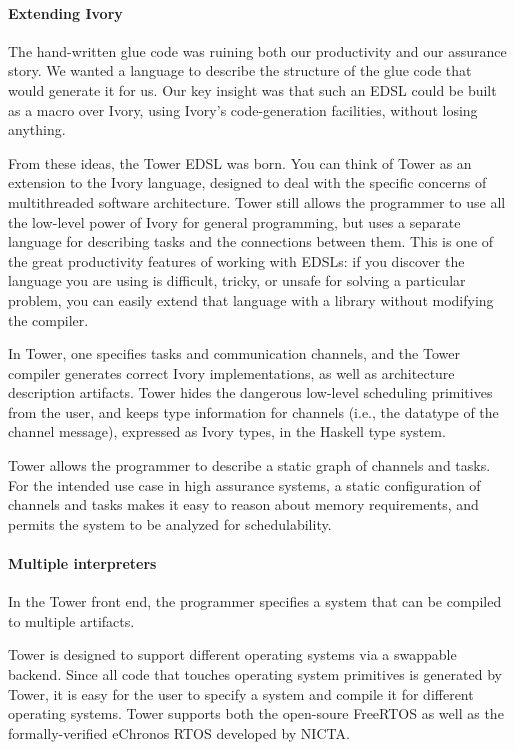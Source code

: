 \paragraph{Extending Ivory}
The hand-written glue code was ruining both our productivity and our assurance
story. We wanted a language to describe the structure of the glue code that
would generate it for us.
Our key insight was that such an EDSL could be built as a macro over Ivory,
using Ivory's code-generation facilities, without losing anything.

From these ideas, the Tower EDSL was born. You can think of Tower as an
extension to the Ivory language, designed to deal with the specific concerns of
multithreaded software architecture. Tower still allows the programmer to use
all the low-level power of Ivory for general programming, but uses a separate
language for describing tasks and the connections between them.  This is one of
the great productivity features of working with EDSLs: if you discover the
language you are using is difficult, tricky, or unsafe for solving a particular
problem, you can easily extend that language with a library without modifying
the compiler.

In Tower, one specifies tasks and communication channels, and the Tower compiler
generates correct
Ivory implementations, as well as architecture description artifacts. Tower
hides the dangerous low-level scheduling primitives from the user, and keeps
type information for channels (i.e., the datatype of the channel message),
expressed as Ivory types, in the Haskell type system.

Tower allows the programmer to describe a static graph of channels and tasks.
For the intended use case in high assurance systems, a static configuration of
channels and tasks makes it easy to reason about memory requirements, and
permits the system to be analyzed for schedulability.

\paragraph{Multiple interpreters}

In the Tower front end, the programmer specifies a system that can be compiled
to multiple artifacts.

Tower is designed to support different operating systems via a swappable
backend. Since all code that touches operating system primitives is generated by
Tower, it is easy for the user to specify a system and compile it for
different operating systems. Tower supports both the open-soure
FreeRTOS\cite{freertos} as well as the formally-verified
eChronos RTOS\cite{echronos} developed by NICTA.

